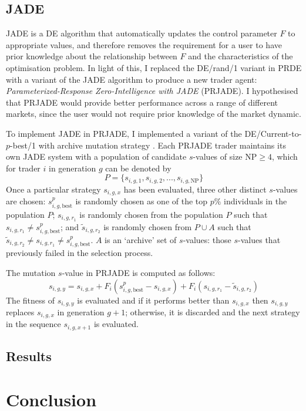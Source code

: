 \documentclass[conference]{IEEEtran}
\begin{document}
\subsection{JADE}

JADE \cite{ZhangSanderson} is a DE algorithm that automatically updates the control parameter $F$ to appropriate values, and therefore removes the requirement for a user to have prior knowledge about the relationship between $F$ and the characteristics of the optimisation problem.
In light of this, I replaced the DE/rand/1 variant in PRDE with a variant of the JADE algorithm to produce a new trader agent: \textit{Parameterized-Response Zero-Intelligence with JADE} (PRJADE).
I hypothesised that PRJADE would provide better performance across a range of different markets, since the user would not require prior knowledge of the market dynamic.

To implement JADE in PRJADE, I implemented a variant of the DE/Current-to-$p$-best/1 with archive mutation strategy \cite{ZhangSanderson}.
Each PRJADE trader maintains its own JADE system with a population of candidate $s$-values of size $\mathrm{NP}\ge 4$, which for trader $i$ in generation $g$ can be denoted by 
\[
    P=\{s_{i,g,1}, s_{i,g,2},...,s_{i,g,\mathrm{NP}}\}
\]
Once a particular strategy $s_{i,g,x}$ has been evaluated, three other distinct $s$-values are chosen: $s^p_{i,g,\text{best}}$ is randomly chosen as one of the top $p\%$ individuals in the population $P$; $s_{i,g,r_1}$ is randomly chosen from the population $P$ such that $s_{i,g,r_1}\ne s^p_{i,g,\text{best}}$; and $\tilde{s}_{i,g,r_2}$ is randomly chosen from $P\cup A$ such that $\tilde{s}_{i,g,r_2}\ne s_{i,g,r_1}\ne s^p_{i,g,\text{best}}$.
$A$ is an `archive' set of $s$-values: those $s$-values that previously failed in the selection process.

The mutation $s$-value in PRJADE is computed as follows:
\[
    s_{i,g,y}=s_{i,g,x}+F_i\left(s^p_{i,g,\text{best}} - s_{i,g,x}\right) + F_i\left(s_{i,g,r_1} - \tilde{s}_{i,g,r_2}\right)
\]
The fitness of $s_{i,g,y}$ is evaluated and if it performs better than $s_{i,g,x}$ then $s_{i,g,y}$ replaces $s_{i,g,x}$ in generation $g+1$; otherwise, it is discarded and the next strategy in the sequence $s_{i,g,x+1}$ is evaluated.

\subsection{Results}

\section{Conclusion}



\end{document}
